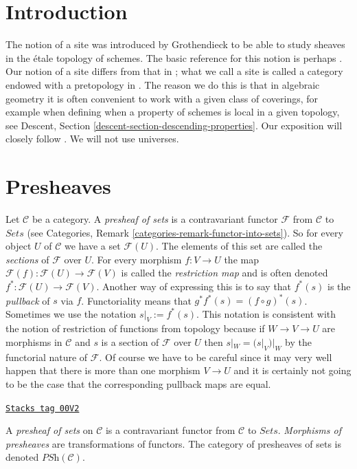\section{Introduction}
\label{sites-section-introduction}
The notion of a site was introduced by Grothendieck to be able to study
sheaves in the \'etale topology of schemes. The basic reference for this
notion is perhaps \cite{SGA4}. Our notion of a site differs from that
in \cite{SGA4}; what we call a site is called a category endowed with
a pretopology in \cite[Expos\'e II, D\'efinition 1.3]{SGA4}.
The reason we do this is that in algebraic geometry it is often convenient to
work with a given class of coverings, for example when defining when
a property of schemes is local in a given topology, see Descent,
Section \ref{descent-section-descending-properties}.
Our exposition will closely follow \cite{ArtinTopologies}.
We will not use universes.

\section{Presheaves}
\label{sites-section-presheaves}
Let $\mathcal{C}$ be a category.
A {\it presheaf of sets} is a contravariant functor $\mathcal{F}$
from $\mathcal{C}$ to $\textit{Sets}$ (see Categories, Remark
\ref{categories-remark-functor-into-sets}).
So for every object $U$ of $\mathcal{C}$ we have a set
$\mathcal{F}(U)$. The elements of this set are called
the {\it sections} of $\mathcal{F}$ over $U$. For every morphism
$f : V \to U$ the map $\mathcal{F}(f) : \mathcal{F}(U) \to \mathcal{F}(V)$
is called the {\it restriction map} and is often denoted
$f^\ast : \mathcal{F}(U) \to \mathcal{F}(V)$. Another way
of expressing this is to say that $f^*(s)$ is the {\it pullback}
of $s$ via $f$. Functoriality means that $g^* f^* (s) = (f \circ g)^*(s)$.
Sometimes we use the notation $s|_V := f^\ast(s)$.
This notation is consistent with the notion of restriction
of functions from topology because if $W \to V \to U$
are morphisms in $\mathcal{C}$ and $s$ is a section of
$\mathcal{F}$ over $U$ then $s|_W = (s|_V)|_W$ by the
functorial nature of $\mathcal{F}$. Of course we have to be
careful since it may very well happen
that there is more than one morphism $V \to U$ and it is
certainly not going to be the case that the corresponding
pullback maps are equal.

\begin{definition}
\label{sites-definition-presheaves-sets}
\href{https://stacks.math.columbia.edu/tag/00V2}{\texttt{Stacks tag 00V2}}

A {\it presheaf of sets} on $\mathcal{C}$ is a contravariant
functor from $\mathcal{C}$ to $\textit{Sets}$. {\it Morphisms
of presheaves} are transformations of functors. The category
of presheaves of sets is denoted $\textit{PSh}(\mathcal{C})$.
\end{definition}


